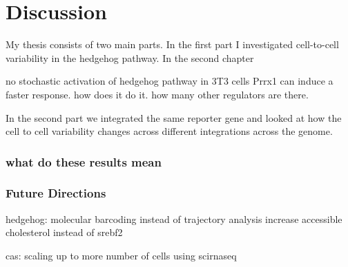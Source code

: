 \chapter{Discussion}
\label{chap:introduction}
\tightlists


My thesis consists of two main parts. In the first part I investigated cell-to-cell variability in the hedgehog pathway. In the second chapter 


no stochastic activation of hedgehog pathway in 3T3 cells
Prrx1 can induce a faster response. how does it do it. how many other regulators are there.

In the second part we integrated the same reporter gene and looked at how the cell to cell variability changes across 
different integrations across the genome.

\subsection{what do these results mean}



\subsection{Future Directions}
hedgehog:
molecular barcoding instead of trajectory analysis
increase accessible cholesterol instead of srebf2



cas:
scaling up to more number of cells using scirnaseq



